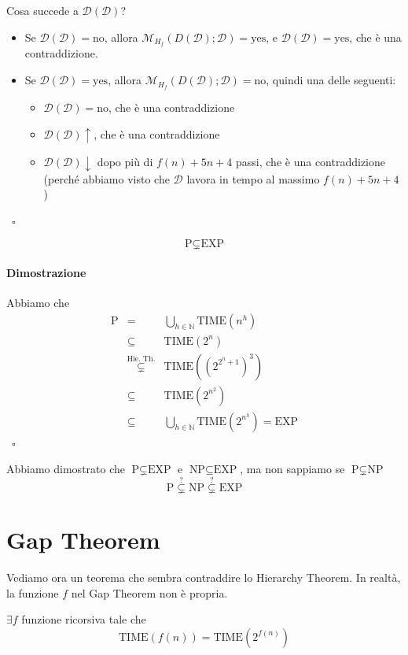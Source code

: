 \noindent Cosa succede a $\mathcal{D}(\mathcal{D})$?
\begin{itemize}
    \item Se $\mathcal{D}(\mathcal{D})=\text{no}$, allora $\mathcal{M}_{H_f}(D(\mathcal{D});\mathcal{D})=\text{yes}$, e $\mathcal{D}(\mathcal{D})=\text{yes}$, che è una contraddizione.
    \item Se $\mathcal{D}(\mathcal{D})=\text{yes}$, allora $\mathcal{M}_{H_f}(D(\mathcal{D});\mathcal{D})=\text{no}$, quindi una delle seguenti:
    \begin{itemize}
        \item $\mathcal{D}(\mathcal{D})=\text{no}$, che è una contraddizione
        \item $\mathcal{D}(\mathcal{D})\uparrow$, che è una contraddizione
        \item $\mathcal{D}(\mathcal{D})\downarrow$ dopo più di $f(n)+5n+4$ passi, che è una contraddizione (perché abbiamo visto che $\mathcal{D}$ lavora in tempo al massimo $f(n)+5n+4$)
    \end{itemize}
\end{itemize}
~\hfill $\square$

\begin{corollary}
    $$
        \text{P}\subsetneq\text{EXP}
    $$
\end{corollary}
\paragraph{Dimostrazione} Abbiamo che
\begin{eqnarray*}
    \text{P} &=& \bigcup_{h\in\mathbb{N}}\text{TIME}\left(n^h\right)\\
    &\subseteq& \text{TIME}(2^n)\\
    &\overset{\text{Hie.~Th.}}{\subsetneq}& \text{TIME}\left(\left(2^{2^n+1}\right)^3\right)\\
    &\subseteq& \text{TIME}\left(2^{n^2}\right)\\
    &\subseteq& \bigcup_{h\in\mathbb{N}}\text{TIME}\left(2^{n^h}\right) = \text{EXP}
\end{eqnarray*}
~\hfill $\square$\medskip

Abbiamo dimostrato che $\text{P}\subsetneq\text{EXP}$ e $\text{NP}\subseteq\text{EXP}$, ma non sappiamo se $\text{P}\subsetneq\text{NP}$
$$
    \text{P} \overset{?}{\subsetneq} \text{NP} \overset{?}{\subsetneq} \text{EXP}
$$


\section{Gap Theorem}
Vediamo ora un teorema che sembra contraddire lo Hierarchy Theorem. In realtà, la funzione $f$ nel Gap Theorem non è propria.
\begin{theorem}
    $\exists f$ funzione ricorsiva tale che 
    $$
        \text{TIME}(f(n)) = \text{TIME}(2^{f(n)})
    $$
\end{theorem}
